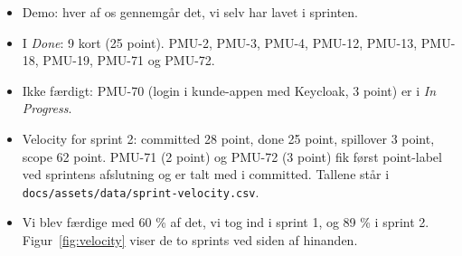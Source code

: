 \documentclass[a4paper,11pt]{article}
\begin{document}
\begin{enumerate}
\begin{itemize}
        \item Demo: hver af os gennemgår det, vi selv har lavet i sprinten.
        \item I \emph{Done}: 9 kort (25 point). PMU-2, PMU-3, PMU-4, PMU-12, PMU-13, PMU-18, PMU-19, PMU-71 og PMU-72.
        \item Ikke færdigt: PMU-70 (login i kunde-appen med Keycloak, 3 point) er i \emph{In Progress}.
        \item Velocity for sprint 2: committed 28 point, done 25 point, spillover 3 point, scope 62 point. PMU-71 (2 point) og PMU-72 (3 point) fik først point-label ved sprintens afslutning og er talt med i committed. Tallene står i \texttt{docs/assets/data/sprint-velocity.csv}.
        \item Vi blev færdige med 60 \% af det, vi tog ind i sprint 1, og 89 \% i sprint 2. Figur~\ref{fig:velocity} viser de to sprints ved siden af hinanden.
    \end{itemize}


\end{enumerate}
\end{document}
